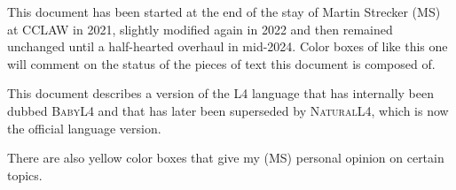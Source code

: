 
\begin{tcolorbox}[breakable,colback=red!5!white,colframe=red!75!black,
  title=Some words of cautioning]

  This document has been started at the end of the stay of Martin Strecker
  (MS) at CCLAW in 2021, slightly modified again in 2022 and then remained
  unchanged until a half-hearted overhaul in mid-2024. Color boxes of like
  this one will comment on the status of the pieces of text this document is
  composed of.

  This document describes a version of the L4 language that has internally
  been dubbed \textsc{BabyL4} and that has later been superseded by
  \textsc{NaturalL4}, which is now the official language version. 

  There are also yellow color boxes that give my (MS) personal opinion on
  certain topics.

\end{tcolorbox}

